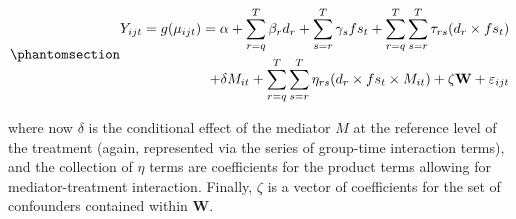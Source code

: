 \documentclass[
  letterpaper,
  DIV=11,
  numbers=noendperiod]{scrartcl}
\makeatletter
\providecommand{\DIFadd}[1]{{\protect\color{blue}\uwave{#1}}} %
\providecommand{\DIFdel}[1]{{\protect\color{red}\sout{#1}}} %
\providecommand{\DIFaddbegin}{} %
\providecommand{\DIFaddend}{} %
\providecommand{\DIFdelbegin}{} %
\providecommand{\DIFdelend}{} %
\newcommand{\DIFscaledelfig}{0.5}
\newlength{\DIFdelgraphicswidth} %
\newlength{\DIFdelgraphicsheight} %
\newcommand{\DIFaddincludegraphics}[2][]{{\color{blue}\fbox{\DIFOincludegraphics[#1]{#2}}}} %
\newcommand{\DIFdelincludegraphics}[2][]{%
\sbox{\DIFdelgraphicsbox}{\DIFOincludegraphics[#1]{#2}}%
\settoboxwidth{\DIFdelgraphicswidth}{\DIFdelgraphicsbox} %
\settoboxtotalheight{\DIFdelgraphicsheight}{\DIFdelgraphicsbox} %
\scalebox{\DIFscaledelfig}{%
\parbox[b]{\DIFdelgraphicswidth}{\usebox{\DIFdelgraphicsbox}\\[-\baselineskip] \rule{\DIFdelgraphicswidth}{0em}}\llap{\resizebox{\DIFdelgraphicswidth}{\DIFdelgraphicsheight}{%
\setlength{\unitlength}{\DIFdelgraphicswidth}%
\begin{picture}(1,1)%
\thicklines\linethickness{2pt} %
{\color[rgb]{1,0,0}\put(0,0){\framebox(1,1){}}}%
{\color[rgb]{1,0,0}\put(0,0){\line( 1,1){1}}}%
{\color[rgb]{1,0,0}\put(0,1){\line(1,-1){1}}}%
\end{picture}%
}\hspace*{3pt}}} %
} %
\DeclareRobustCommand{\DIFaddbegin}{\DIFOaddbegin \let\includegraphics\DIFaddincludegraphics} %
\DeclareRobustCommand{\DIFaddend}{\DIFOaddend \let\includegraphics\DIFOincludegraphics} %
\DeclareRobustCommand{\DIFdelbegin}{\DIFOdelbegin \let\includegraphics\DIFdelincludegraphics} %
\DeclareRobustCommand{\DIFdelend}{\DIFOaddend \let\includegraphics\DIFOincludegraphics} %
\let\sout@orig\sout %
\renewcommand{\sout}[1]{\ifmmode\text{\sout@orig{\ensuremath{#1}}}\else\sout@orig{#1}\fi} %
\makeatother
\begin{document}
\begin{equation}\phantomsection\DIFdelbegin %
\DIFdelend \DIFaddbegin \label{eq-etwfem}{
\begin{aligned}
Y_{ijt}=g(\mu_{ijt}) = \alpha + \sum_{r=q}^{T} \beta_{r} d_{r} + \sum_{s=r}^{T} \gamma_{s} fs_{t}+ \sum_{r=q}^{T} \sum_{s=r}^{T} \tau_{rs} (d_{r} \times fs_{t}) \\ + \delta M_{it} + \sum_{r=q}^{T} \sum_{s=r}^{T} \eta_{rs} (d_{r} \times fs_{t} \times M_{it}) + \zeta \mathbf{W} + \varepsilon_{ijt}
\end{aligned}
}\DIFaddend \end{equation}

where now \(\delta\) is the conditional effect of the mediator \(M\) at
the reference level of the treatment (again, represented via the series
of group-time interaction terms), and the collection of \DIFdelbegin \DIFdel{\(\eta\) }\DIFdelend \DIFaddbegin \DIFadd{\(\eta_{rs}\)
}\DIFaddend terms are coefficients for the product terms allowing for
mediator-treatment interaction. Finally, \(\zeta\) is a vector of
coefficients for the set of confounders contained within \(\mathbf{W}\).
\DIFdelbegin %
\end{document}

